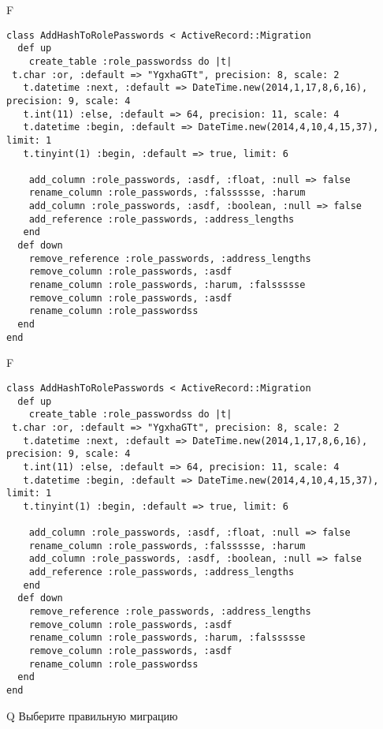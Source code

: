 F
\begin{verbatim}
class AddHashToRolePasswords < ActiveRecord::Migration
  def up
    create_table :role_passwordss do |t| 
 t.char :or, :default => "YgxhaGTt", precision: 8, scale: 2
   t.datetime :next, :default => DateTime.new(2014,1,17,8,6,16), precision: 9, scale: 4
   t.int(11) :else, :default => 64, precision: 11, scale: 4
   t.datetime :begin, :default => DateTime.new(2014,4,10,4,15,37), limit: 1
   t.tinyint(1) :begin, :default => true, limit: 6

    add_column :role_passwords, :asdf, :float, :null => false
    rename_column :role_passwords, :falssssse, :harum
    add_column :role_passwords, :asdf, :boolean, :null => false
    add_reference :role_passwords, :address_lengths
   end
  def down
    remove_reference :role_passwords, :address_lengths
    remove_column :role_passwords, :asdf
    rename_column :role_passwords, :harum, :falssssse
    remove_column :role_passwords, :asdf
    rename_column :role_passwordss
  end
end
\end{verbatim}

F
\begin{verbatim}
class AddHashToRolePasswords < ActiveRecord::Migration
  def up
    create_table :role_passwordss do |t| 
 t.char :or, :default => "YgxhaGTt", precision: 8, scale: 2
   t.datetime :next, :default => DateTime.new(2014,1,17,8,6,16), precision: 9, scale: 4
   t.int(11) :else, :default => 64, precision: 11, scale: 4
   t.datetime :begin, :default => DateTime.new(2014,4,10,4,15,37), limit: 1
   t.tinyint(1) :begin, :default => true, limit: 6

    add_column :role_passwords, :asdf, :float, :null => false
    rename_column :role_passwords, :falssssse, :harum
    add_column :role_passwords, :asdf, :boolean, :null => false
    add_reference :role_passwords, :address_lengths
   end
  def down
    remove_reference :role_passwords, :address_lengths
    remove_column :role_passwords, :asdf
    rename_column :role_passwords, :harum, :falssssse
    remove_column :role_passwords, :asdf
    rename_column :role_passwordss
  end
end
\end{verbatim}
Q
Выберите правильную миграцию

